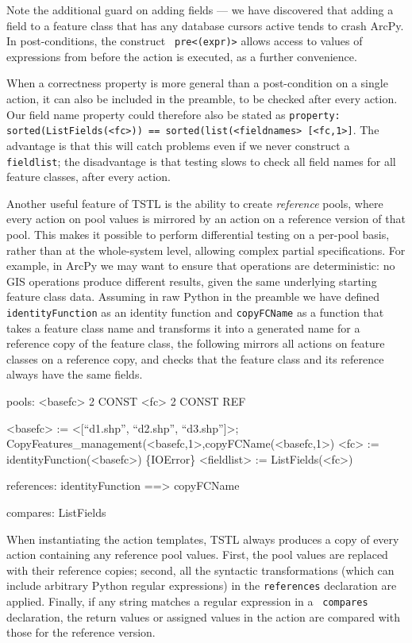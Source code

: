 Note the additional guard on adding fields --- we have discovered that
adding a field to a feature class that has any database cursors active
tends to crash ArcPy.  In post-conditions, the construct {\tt
  pre<(expr)>} allows access to values of expressions from before the
action is executed, as a further convenience.

When a correctness property is more general than a post-condition on a
single action, it can also be included in the preamble, to be checked
after every action.  Our field name property could therefore also be
stated as {\tt property: sorted(ListFields(<fc>)) ==
  sorted(list(<fieldnames> [<fc,1>]}.  The advantage is that this will
catch problems even if we never construct a {\tt fieldlist}; the
disadvantage is that testing slows to check all field names for all
feature classes, after every action.

Another useful feature of TSTL is the ability to create
\emph{reference} pools, where every action on pool values is mirrored
by an action on a reference version of that pool.  This makes it
possible to perform differential testing \cite{Differential} on a
per-pool basis, rather than at the whole-system level, allowing
complex partial specifications.  For example, in ArcPy we may want to
ensure that operations are deterministic: no GIS operations produce
different results, given the same underlying starting feature class
data.  Assuming in raw Python in the preamble we have defined {\tt
  identityFunction} as an identity function and {\tt copyFCName} as a
function that takes a feature class name and transforms it into a
generated name for a reference copy of the feature class, the
following mirrors all actions on feature classes on a reference copy,
and checks that the feature class and its reference always have the
same fields.

{\scriptsize
\begin{code}
pools:
  <basefc> 2 CONST
  <fc> 2 CONST REF

<basefc> := <[``d1.shp'', ``d2.shp'', ``d3.shp'']>; \\
  CopyFeatures\_management(<basefc,1>,copyFCName(<basefc,1>)
<fc> := identityFunction(<basefc>)
\{IOError\} <fieldlist> := ListFields(<fc>)

references:
  identityFunction ==> copyFCName

compares:
  ListFields
\end{code}
}

When instantiating the action templates, TSTL always produces a copy
of every action containing any reference pool values.  First, the pool
values are replaced with their reference copies; second, all the
syntactic transformations (which can include arbitrary Python regular
expressions) in the {\tt references} declaration are applied.
Finally, if any string matches a regular expression in a {\tt
  compares} declaration, the return values or assigned values in the
action are compared with those for the reference version.

